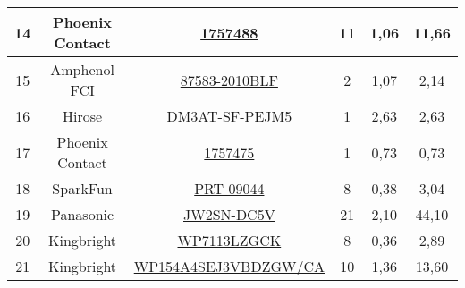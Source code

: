 \begin{table}[H]
\begin{tabular}{|c|c|c|c|c|c|}
14                   & Phoenix Contact     & \href{http://www.phoenixcontact.com/de/produkte/1757488/pdf}{1757488}                                                                                                                                                  & 11       & 1,06            & 11,66           \\ \hline
15                   & Amphenol FCI        & \href{https://ar.mouser.com/datasheet/2/18/1/87583-2579162.pdf}{87583-2010BLF}                                                                                                                                         & 2        & 1,07            & 2,14            \\ \hline
16                   & Hirose              & \href{https://datasheet.lcsc.com/szlcsc/Hirose-HRS-DM3AT-SF-PEJM5_C114218.pdf}{DM3AT-SF-PEJM5}                                                                                                                        & 1        & 2,63            & 2,63            \\ \hline
17                   & Phoenix Contact     & \href{http://www.phoenixcontact.com/de/produkte/1757475/pdf}{1757475}                                                                                                                                                  & 1        & 0,73            & 0,73            \\ \hline
18                   & SparkFun            & \href{https://cdn.sparkfun.com/assets/1/c/f/7/9/DS-16581-Female_Header_2x18.pdf}{PRT-09044}                                                                                                                          & 8        & 0,38            & 3,04            \\ \hline
19                   & Panasonic           & \href{https://www3.panasonic.biz/ac/e_download/control/relay/power/catalog/mech_eng_jw.pdf}{JW2SN-DC5V}                                                                                                             & 21       & 2,10            & 44,10           \\ \hline
20                   & Kingbright          & \href{https://www.mouser.com/datasheet/2/216/WP7113LZGCK-535810.pdf}{WP7113LZGCK}                                                                                                                                      & 8        & 0,36            & 2,89            \\ \hline
21                   & Kingbright          & \href{http://www.kingbrightusa.com/images/catalog/SPEC/WP154A4SEJ3VBDZGW-CA.pdf}{WP154A4SEJ3VBDZGW/CA}                                                                                                                 & 10       & 1,36            & 13,60           \\ \hline

\end{tabular}
\end{table}
